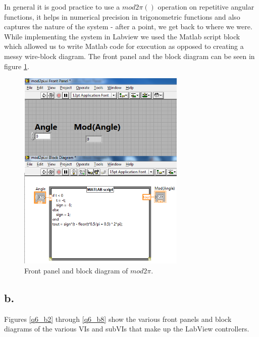 \documentclass{article}
\theoremstyle{plain}
\theoremstyle{definition}
\theoremstyle{remark}
\begin{document}
In general it is good practice to use a $mod2\pi()$ operation on repetitive angular functions, it helps in numerical precision in trigonometric functions and also captures the nature of the system - after a point, we get back to where we were.\\

While implementing the system in Labview we used the Matlab script block which allowed us to write Matlab code for execution as opposed to creating a messy wire-block diagram. The front panel and the block diagram can be seen in figure \ref{q6_a}.

\begin{figure}[htb]
\begin{center}
\includegraphics[width = 8cm]{q6_a.png}
\end{center}
\caption{Front panel and block diagram of $mod2\pi$.}
\label{q6_a}
\end{figure}

\clearpage

\subsection*{b.}

Figures \ref{q6_b2} through \ref{q6_b8} show the various front panels and block diagrams of the various VIs and subVIs that make up the LabView controllers.
\end{document}
